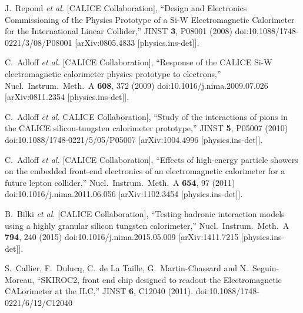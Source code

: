 \documentclass[a4paper,11pt]{article}
\begin{document}
\begin{thebibliography}{99}
  J.~Repond {\it et al.} [CALICE Collaboration],
  ``Design and Electronics Commissioning of the Physics Prototype of a Si-W Electromagnetic Calorimeter for the International Linear Collider,''
  JINST {\bf 3}, P08001 (2008)
  doi:10.1088/1748-0221/3/08/P08001
  [arXiv:0805.4833 [physics.ins-det]].

  C.~Adloff {\it et al.} [CALICE Collaboration],
  ``Response of the CALICE Si-W electromagnetic calorimeter physics prototype to electrons,''
  Nucl.\ Instrum.\ Meth.\ A {\bf 608}, 372 (2009)
  doi:10.1016/j.nima.2009.07.026
  [arXiv:0811.2354 [physics.ins-det]].

  C.~Adloff {\it et al.} CALICE Collaboration],
  ``Study of the interactions of pions in the CALICE silicon-tungsten calorimeter prototype,''
  JINST {\bf 5}, P05007 (2010)
  doi:10.1088/1748-0221/5/05/P05007
  [arXiv:1004.4996 [physics.ins-det]].

  C.~Adloff {\it et al.} [CALICE Collaboration],
  ``Effects of high-energy particle showers on the embedded front-end electronics of an electromagnetic calorimeter for a future lepton collider,''
  Nucl.\ Instrum.\ Meth.\ A {\bf 654}, 97 (2011)
  doi:10.1016/j.nima.2011.06.056
  [arXiv:1102.3454 [physics.ins-det]].

  B.~Bilki {\it et al.} [CALICE Collaboration],
  ``Testing hadronic interaction models using a highly granular silicon tungsten calorimeter,''
  Nucl.\ Instrum.\ Meth.\ A {\bf 794}, 240 (2015)
  doi:10.1016/j.nima.2015.05.009
  [arXiv:1411.7215 [physics.ins-det]].

  S.~Callier, F.~Dulucq, C.~de La Taille, G.~Martin-Chassard and N.~Seguin-Moreau,
  ``SKIROC2, front end chip designed to readout the Electromagnetic CALorimeter at the ILC,''
  JINST {\bf 6}, C12040 (2011).
  doi:10.1088/1748-0221/6/12/C12040


\end{thebibliography}
\end{document}
